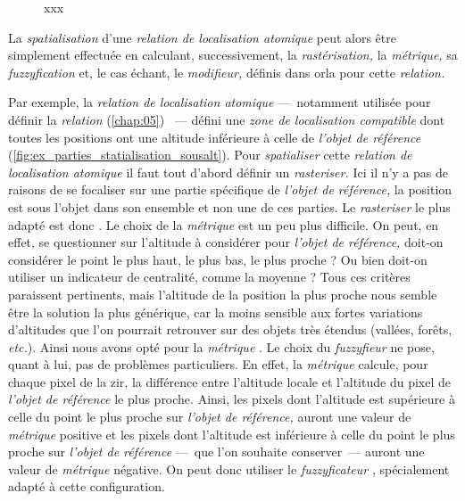 \begin{figure}
  \centering
  
  \caption{xxx}
  \label{fig:structure_spatialisation_ontologie}
\end{figure}

La \emph{spatialisation} d'une \emph{relation de localisation
  atomique} peut alors être simplement effectuée en calculant,
successivement, la \emph{rastérisation,} la \emph{métrique,} sa
\emph{fuzzyfication} et, le cas échant, le \emph{modifieur,} définis
dans \ac{orla} pour cette \emph{relation.}

Par exemple, la \emph{relation de localisation atomique}
 ---~notamment utilisée pour définir
la \emph{relation}  (\autoref{chap:05})
~--- défini une \emph{zone de localisation compatible} dont
toutes les positions ont une altitude inférieure à celle de
\emph{l'objet de référence}
(\autoref{fig:ex_parties_statialisation_sousalt}). Pour
\emph{spatialiser} cette \emph{relation de localisation atomique} il
faut tout d'abord définir un \emph{rasteriser.} Ici il n'y a pas de
raisons de se focaliser sur une partie spécifique de \emph{l'objet de
  référence,} la position est sous l'objet dans son ensemble et non
une de ces parties. Le \emph{rasteriser} le plus adapté est donc
. Le choix de la \emph{métrique} est un peu plus
difficile. On peut, en effet, se questionner sur l'altitude à
considérer pour \emph{l'objet de référence,} doit-on considérer le
point le plus haut, le plus bas, le plus proche ? Ou bien doit-on
utiliser un indicateur de centralité, comme la moyenne ? Tous ces
critères paraissent pertinents, mais l'altitude de la position la plus
proche nous semble être la solution la plus générique, car la moins
sensible aux fortes variations d'altitudes que l'on pourrait retrouver
sur des objets très étendus (\eg vallées, forêts, \emph{etc.}). Ainsi
nous avons opté pour la \emph{métrique}
. Le choix du \emph{fuzzyfieur} ne
pose, quant à lui, pas de problèmes particuliers. En effet, la
\emph{métrique}  calcule, pour chaque
pixel de la \ac{zir}, la différence entre l'altitude locale et
l'altitude du pixel de \emph{l'objet de référence} le plus
proche. Ainsi, les pixels dont l'altitude est supérieure à celle du
point le plus proche sur \emph{l'objet de référence,} auront une
valeur de \emph{métrique} positive et les pixels dont l'altitude est
inférieure à celle du point le plus proche sur \emph{l'objet de
  référence} ---~que l'on souhaite conserver~--- auront une valeur de
\emph{métrique} négative. On peut donc utiliser le
\emph{fuzzyficateur} , spécialement adapté à
cette configuration.

